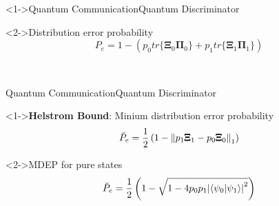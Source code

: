 \begin{frame}<1->{Quantum Communication}{Quantum Discriminator}
    \begin{block}<2->{Distribution error probability}
        \begin{equation*}
            P_e=1-\left(p_0 tr\{\pmb{\Xi}_0\pmb{\Pi}_0\}+p_1 tr\{\pmb{\Xi}_1\pmb{\Pi}_1\}\right)
        \end{equation*}
    \end{block}
    \ \mbox{} \\ \mbox{} 
\end{frame}

\begin{frame}{Quantum Communication}{Quantum Discriminator}
    \begin{block}<1->{\textbf{Helstrom Bound}: Minium distribution error probability}
        \begin{equation*}
            \breve{P}_e = \frac{1}{2} \left(1-\norm{p_1 \pmb{\Xi}_1 - p_0 \pmb{\Xi}_0}_1 \right)
        \end{equation*}
    \end{block}
    \begin{block}<2->{MDEP for pure states}
        \begin{equation*}
            \breve{P}_e = \frac{1}{2} \left(1- \sqrt{1-4 p_0 p_1 \absolutevalue{
                \braket{\psi_0}{\psi_1}}^2}\right)
        \end{equation*}
    \end{block}
\end{frame}